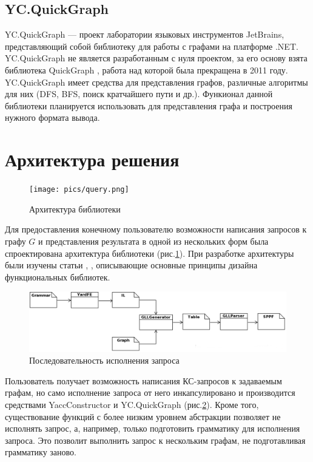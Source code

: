 \documentclass[14pt]{matmex-diploma-custom}
\begin{document}
	\subsection{YC.QuickGraph}
	    YC.QuickGraph --- проект лаборатории языковых инструментов JetBrains, представляющий собой библиотеку для работы с графами на платформе .NET. YC.QuickGraph не является разработанным с нуля проектом, за его основу взята библиотека QuickGraph \cite{quickgraph}, работа над которой была прекращена в 2011 году. YC.QuickGraph имеет средства для представления графов, различные алгоритмы для них (DFS, BFS, поиск кратчайшего пути и др.). Функионал данной библиотеки планируется использовать для представления графа и построения нужного формата вывода.
\section{Архитектура решения}
    \begin{figure}
        \centering
        \texttt{[image: pics/query.png]}
        \caption{Архитектура библиотеки \label{arch_lib}}
    \end{figure}
    Для предоставления конечному пользователю возможности написания запросов к графу \(G\) и представления результата в одной из нескольких форм была спроектирована архитектура библиотеки (рис.\ref{arch_lib}). При разработке архитектуры были изучены статьи \cite{funcdes1}, \cite{funcdes2}, описывающие основные принципы дизайна функциональных библиотек.
    \begin{figure}
        \centering
        \includegraphics[width=\textwidth]{pics/pipeline.png}
        \caption{Последовательность исполнения запроса \label{pipeline}}
    \end{figure}
    Пользователь получает возможность написания КС-запросов к задаваемым графам, но само исполнение запроса от него инкапсулировано и производится средствами YaccConstructor и YC.QuickGraph (рис.\ref{pipeline}). Кроме того, существование функций с более низким уровнем абстракции позволяет не исполнять запрос, а, например, только подготовить грамматику для исполнения запроса. Это позволит выполнить запрос к нескольким графам, не подготавливая грамматику заново.
    
\end{document}
